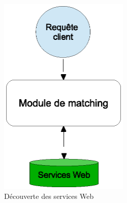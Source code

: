 \begin{figure}[h]
    \centering
    \includegraphics[width=0.55\textwidth]{figs/ws-discovery-with-matching.eps}
    \caption{Découverte des services Web}
    \label{fig:ws-discovery-with-matching}
\end{figure}

